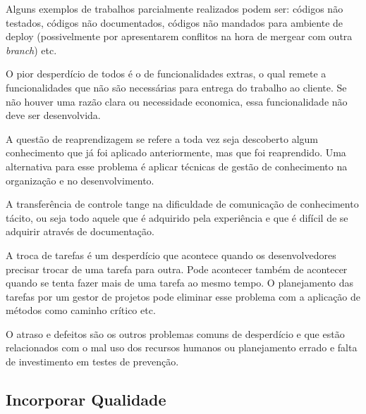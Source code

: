 Alguns exemplos de trabalhos parcialmente realizados podem ser: códigos não testados, códigos não documentados, códigos não mandados para ambiente de deploy (possivelmente por apresentarem conflitos na hora de mergear com outra \textit{branch}) etc.

O pior desperdício de todos é o de funcionalidades extras, o qual remete a funcionalidades que não são necessárias para entrega do trabalho ao cliente. Se não houver uma razão clara ou necessidade economica, essa funcionalidade não deve ser desenvolvida.

A questão de reaprendizagem se refere a toda vez seja descoberto algum conhecimento que já foi aplicado anteriormente, mas que foi reaprendido. Uma alternativa para esse problema é aplicar técnicas de gestão de conhecimento na organização e no desenvolvimento.

A transferência de controle tange na dificuldade de comunicação de conhecimento tácito, ou seja todo aquele que é adquirido pela experiência e que é difícil de se adquirir através de documentação. 

A troca de tarefas é um desperdício que acontece quando os desenvolvedores precisar trocar de uma tarefa para outra. Pode acontecer também de acontecer quando se tenta fazer mais de uma tarefa ao mesmo tempo. O planejamento das tarefas por um gestor de projetos pode eliminar esse problema com a aplicação de métodos como caminho crítico etc.

O atraso e defeitos são os outros problemas comuns de desperdício e que estão relacionados com o mal uso dos recursos humanos ou planejamento errado e falta de investimento em testes de prevenção.

\subsection{Incorporar Qualidade}
\label{sec:quality}

